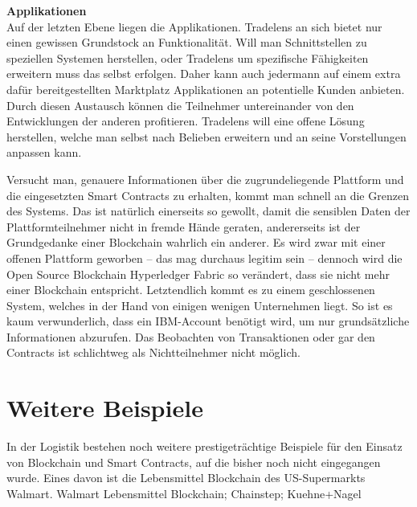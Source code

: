 \textbf{Applikationen}\\
Auf der letzten Ebene liegen die Applikationen. Tradelens an sich bietet nur einen gewissen Grundstock an Funktionalität. Will man Schnittstellen zu speziellen Systemen herstellen, oder Tradelens um spezifische Fähigkeiten erweitern muss das selbst erfolgen. Daher kann auch jedermann auf einem extra dafür bereitgestellten Marktplatz Applikationen an potentielle Kunden anbieten. Durch diesen Austausch können die Teilnehmer untereinander von den Entwicklungen der anderen profitieren. Tradelens will eine offene Lösung herstellen, welche man selbst nach Belieben erweitern und an seine Vorstellungen anpassen kann. \cite[vgl.][S. 5]{Tradelens2019b}

Versucht man, genauere Informationen über die zugrundeliegende Plattform und die eingesetzten Smart Contracts zu erhalten, kommt man schnell an die Grenzen des Systems. Das ist natürlich einerseits so gewollt, damit die sensiblen Daten der Plattformteilnehmer nicht in fremde Hände geraten, andererseits ist der Grundgedanke einer Blockchain wahrlich ein anderer. Es wird zwar mit einer offenen Plattform geworben -- das mag durchaus legitim sein -- dennoch wird die Open Source Blockchain Hyperledger Fabric so verändert, dass sie nicht mehr einer Blockchain entspricht. Letztendlich kommt es zu einem geschlossenen System, welches in der Hand von einigen wenigen Unternehmen liegt. So ist es kaum verwunderlich, dass ein IBM-Account benötigt wird, um nur grundsätzliche Informationen abzurufen. Das Beobachten von Transaktionen oder gar den Contracts ist schlichtweg als Nichtteilnehmer nicht möglich.

\section{Weitere Beispiele}
In der Logistik bestehen noch weitere prestigeträchtige Beispiele für den Einsatz von Blockchain und Smart Contracts, auf die bisher noch nicht eingegangen wurde. Eines davon ist die Lebensmittel Blockchain des US-Supermarkts Walmart.
Walmart Lebensmittel Blockchain; Chainstep; Kuehne+Nagel